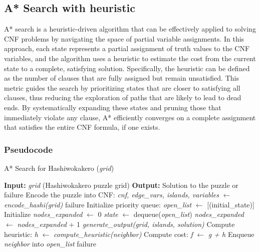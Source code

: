\subsection{A* Search with heuristic}
\noindent A* search is a heuristic-driven algorithm that can be effectively applied to solving CNF problems by navigating the space of partial variable assignments. In this approach, each state represents a partial assignment of truth values to the CNF variables, and the algorithm uses a heuristic to estimate the cost from the current state to a complete, satisfying solution. Specifically, the heuristic can be defined as the number of clauses that are fully assigned but remain unsatisfied. This metric guides the search by prioritizing states that are closer to satisfying all clauses, thus reducing the exploration of paths that are likely to lead to dead ends. By systematically expanding these states and pruning those that immediately violate any clause, A* efficiently converges on a complete assignment that satisfies the entire CNF formula, if one exists.

\subsubsection{Pseudocode}
\begin{algorithm}[H]
    \caption{A* Search for Hashiwokakero (\textit{grid})}
    \label{alg:astar_hashiwokakero}
    \begin{algorithmic}[1]
        \State \textbf{Input:} \textit{grid} (Hashiwokakero puzzle grid)
        \State \textbf{Output:} Solution to the puzzle or failure
        \State Encode the puzzle into CNF: \textit{cnf, edge\_vars, islands, variables} $\gets$ \textit{encode\_hashi(grid)}
        \State \Return failure
        \EndIf
        \State Initialize priority queue: \textit{open\_list} $\gets$ [(initial\_state)]
        \State Initialize \textit{nodes\_expanded} $\gets$ 0
        \State \textit{state} $\gets$ dequeue(\textit{open\_list})
        \State \textit{nodes\_expanded} $\gets$ \textit{nodes\_expanded} + 1
        \State \Return \textit{generate\_output(grid, islands, solution)}
        \EndIf
        \State Compute heuristic: \textit{h} $\gets$ \textit{compute\_heuristic(neighbor)}
        \State Compute cost: \textit{f} $\gets$ \textit{g + h}
        \State Enqueue \textit{neighbor} into \textit{open\_list}
        \EndIf
        \EndFor
        \EndWhile
        \State \Return failure
    \end{algorithmic}
\end{algorithm}

